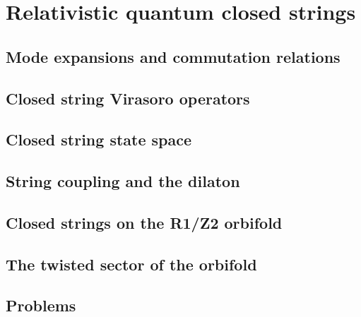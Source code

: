 \documentclass[12pt]{report}
\begin{document}
\chapter{Relativistic quantum closed strings}
\newpage
\section{Mode expansions and commutation relations}
\section{Closed string Virasoro operators}
\section{Closed string state space}
\section{String coupling and the dilaton}
\section{Closed strings on the R1/Z2 orbifold}
\section{The twisted sector of the orbifold}
\section{Problems}
\end{document}
